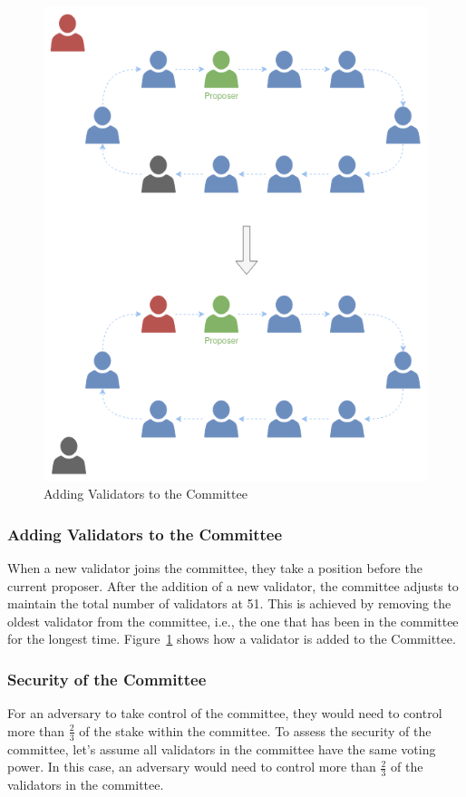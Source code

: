 \documentclass{novel}
\begin{document}
\begin{figure}[h]
	\centering
	\includegraphics[scale=0.4]{cav.png}
	\caption{Adding Validators to the Committee}
	\label{fig:cav}
	\centering
\end{figure}

\subsubsection{Adding Validators to the Committee}
When a new validator joins the committee, they take a position before the current proposer. After the addition of a new validator, the committee adjusts to maintain the total number of validators at 51. This is achieved by removing the oldest validator from the committee, i.e., the one that has been in the committee for the longest time. Figure~\ref{fig:cav} shows how a validator is added to the Committee.

\subsubsection{Security of the Committee}
For an adversary to take control of the committee, they would need to control more than $\frac{2}{3}$ of the stake within the committee. To assess the security of the committee, let’s assume all validators in the committee have the same voting power. In this case, an adversary would need to control more than $\frac{2}{3}$ of the validators in the committee.
\end{document}
